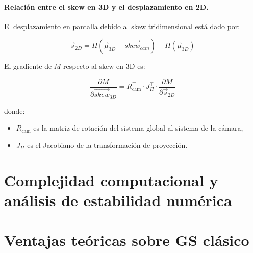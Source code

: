 \paragraph{Relación entre el skew en 3D y el desplazamiento en 2D.}

El desplazamiento en pantalla debido al skew tridimensional está dado por:

\begin{equation}
\vec{s}_{2D} = \Pi(\vec{\mu}_{3D} + \vec{skew}_{cam}) - \Pi(\vec{\mu}_{3D})
\end{equation}

El gradiente de \( M \) respecto al skew en 3D es:

\begin{equation}
\frac{\partial M}{\partial \vec{skew}_{3D}} = R_{\text{cam}}^\top \cdot J_{\Pi}^\top \cdot \frac{\partial M}{\partial \vec{s}_{2D}}
\end{equation}

donde:
\begin{itemize}
    \item \( R_{\text{cam}} \) es la matriz de rotación del sistema global al sistema de la cámara,
    \item \( J_{\Pi} \) es el Jacobiano de la transformación de proyección.
\end{itemize}


\section{Complejidad computacional y análisis de estabilidad numérica}
\section{Ventajas teóricas sobre GS clásico}
